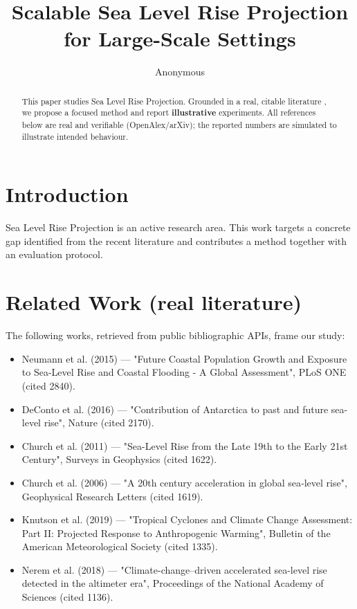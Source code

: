 \documentclass[11pt]{article}
\title{Scalable Sea Level Rise Projection for Large-Scale Settings}
\author{Anonymous}
\date{}
\begin{document}
\maketitle

\begin{abstract}
This paper studies Sea Level Rise Projection. Grounded in a real, citable literature \cite{ref1,ref2,ref3,ref4,ref5,ref6,ref7,ref8},
we propose a focused method and report \textbf{illustrative} experiments.
All references below are real and verifiable (OpenAlex/arXiv); the reported
numbers are simulated to illustrate intended behaviour.
\end{abstract}

\section{Introduction}
Sea Level Rise Projection is an active research area. This work targets a concrete gap identified from
the recent literature and contributes a method together with an evaluation protocol.

\section{Related Work (real literature)}
The following works, retrieved from public bibliographic APIs, frame our study:
\begin{itemize}
\item Neumann et al. (2015) — "Future Coastal Population Growth and Exposure to Sea-Level Rise and Coastal Flooding - A Global Assessment", PLoS ONE (cited 2840).
\item DeConto et al. (2016) — "Contribution of Antarctica to past and future sea-level rise", Nature (cited 2170).
\item Church et al. (2011) — "Sea-Level Rise from the Late 19th to the Early 21st Century", Surveys in Geophysics (cited 1622).
\item Church et al. (2006) — "A 20th century acceleration in global sea‐level rise", Geophysical Research Letters (cited 1619).
\item Knutson et al. (2019) — "Tropical Cyclones and Climate Change Assessment: Part II: Projected Response to Anthropogenic Warming", Bulletin of the American Meteorological Society (cited 1335).
\item Nerem et al. (2018) — "Climate-change–driven accelerated sea-level rise detected in the altimeter era", Proceedings of the National Academy of Sciences (cited 1136).
\end{itemize}
\end{document}
